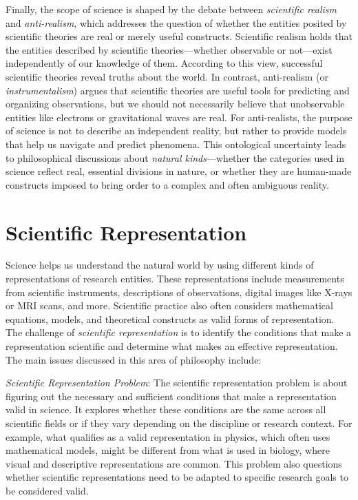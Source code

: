 Finally, the scope of science is shaped by the debate between \emph{scientific realism} and \emph{anti-realism}, which addresses the question of whether the entities posited by scientific theories are real or merely useful constructs. Scientific realism holds that the entities described by scientific theories—whether observable or not—exist independently of our knowledge of them. According to this view, successful scientific theories reveal truths about the world. In contrast, anti-realism (or \emph{instrumentalism}) argues that scientific theories are useful tools for predicting and organizing observations, but we should not necessarily believe that unobservable entities like electrons or gravitational waves are real. For anti-realists, the purpose of science is not to describe an independent reality, but rather to provide models that help us navigate and predict phenomena. This ontological uncertainty leads to philosophical discussions about \emph{natural kinds}—whether the categories used in science reflect real, essential divisions in nature, or whether they are human-made constructs imposed to bring order to a complex and often ambiguous reality. 

%
%

\section{Scientific Representation}
\label{sec:scientific_representation}

Science helps us understand the natural world by using different kinds of representations of research entities. These representations include measurements from scientific instruments, descriptions of observations, digital images like X-rays or MRI scans, and more. Scientific practice also often considers mathematical equations, models, and theoretical constructs as valid forms of representation. The challenge of \emph{scientific representation} is to identify the conditions that make a representation scientific and determine what makes an effective representation. The main issues discussed in this area of philosophy include:

\emph{Scientific Representation Problem}: The scientific representation problem is about figuring out the necessary and sufficient conditions that make a representation valid in science. It explores whether these conditions are the same across all scientific fields or if they vary depending on the discipline or research context. For example, what qualifies as a valid representation in physics, which often uses mathematical models, might be different from what is used in biology, where visual and descriptive representations are common. This problem also questions whether scientific representations need to be adapted to specific research goals to be considered valid.


